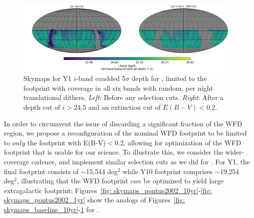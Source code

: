 \begin{figure}[H]
	\vspace*{2em}
	\centering\includegraphics[width=\linewidth,trim={30 40 40 40},clip=false]{figures/lss_final_footprint_skymap_baseline2018a_nside256_RandomDitherPerNight_1yr_iband.png}
	\vspace*{1em}
	\caption{Skymaps for Y1 $i$-band coadded 5$\sigma$ depth for , limited to the footprint with coverage in all six bands with random, per night translational dithers. \textit{Left}: Before any selection cuts.  \textit{Right}: After a depth cut of $i>24.5$ and an extinction cut of $E(B-V)<0.2$.}
	\label{fig: skymaps_baseline_1yr}
\end{figure}

In order to circumvent the issue of discarding a significant fraction of the WFD region, we propose a reconfiguration of the nominal WFD footprint to be limited to $only$ the footprint with E(B-V)$<0.2$, allowing for optimization of the WFD footprint that is usable for our science. To illustrate this, we consider the wider-coverage  cadence,  and implement similar selection cuts as we did for . For Y1, the final footprint consists of $\sim$15,544 deg$^2$ while Y10 footprint comprises $\sim$19,254 deg$^2$, illustrating that the WFD footprint $can$ be optimized to yield large extragalactic footprint; Figures~\ref{fig: skymaps_pontus2002_10yr}-\ref{fig: skymaps_pontus2002_1yr}  show the analogs of Figures~\ref{fig: skymaps_baseline_10yr}-\ref{fig: skymaps_baseline_1yr} for .

